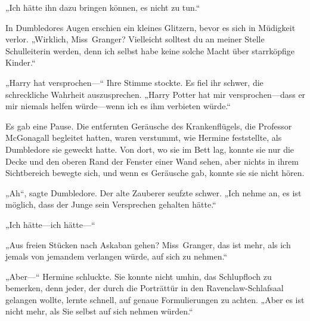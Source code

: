 „Ich hätte ihn dazu bringen können, es nicht zu tun.“

In Dumbledores Augen erschien ein kleines Glitzern, bevor es sich in Müdigkeit verlor. „Wirklich, Miss~Granger? Vielleicht solltest du an meiner Stelle Schulleiterin werden, denn ich selbst habe keine solche Macht über starrköpfige Kinder.“

„Harry hat versprochen—“ Ihre Stimme stockte. Es fiel ihr schwer, die schreckliche Wahrheit auszusprechen. „Harry Potter hat mir versprochen—dass er mir niemals helfen würde—wenn ich es ihm verbieten würde.“

Es gab eine Pause. Die entfernten Geräusche des Krankenflügels, die Professor McGonagall begleitet hatten, waren verstummt, wie Hermine feststellte, als Dumbledore sie geweckt hatte. Von dort, wo sie im Bett lag, konnte sie nur die Decke und den oberen Rand der Fenster einer Wand sehen, aber nichts in ihrem Sichtbereich bewegte sich, und wenn es Geräusche gab, konnte sie sie nicht hören.

„Ah“, sagte Dumbledore. Der alte Zauberer seufzte schwer. „Ich nehme an, es ist möglich, dass der Junge sein Versprechen gehalten hätte.“

„Ich hätte—ich hätte—“

„Aus freien Stücken nach Askaban gehen? Miss~Granger, das ist mehr, als ich jemals von jemandem verlangen würde, auf sich zu nehmen.“

„Aber—“ Hermine schluckte. Sie konnte nicht umhin, das Schlupfloch zu bemerken, denn jeder, der durch die Porträttür in den Ravenclaw-Schlafsaal gelangen wollte, lernte schnell, auf genaue Formulierungen zu achten. „Aber es ist nicht mehr, als Sie selbst auf sich nehmen würden.“

